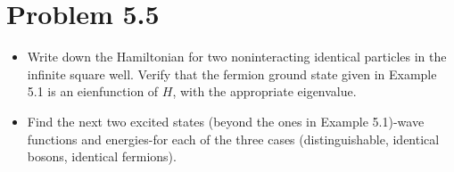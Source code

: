 \documentclass[../main.tex]{subfiles}
\begin{document}
\section{Problem 5.5}

\begin{itemize}
    \item Write down the Hamiltonian for two noninteracting identical particles in the infinite square well.
        Verify that the fermion ground state given in Example 5.1 is an eienfunction of $H$, with the appropriate eigenvalue.
    \item Find the next two excited states (beyond the ones in Example 5.1)-wave functions and energies-for each of the three cases (distinguishable, identical bosons, identical fermions).
\end{itemize}
\end{document}
